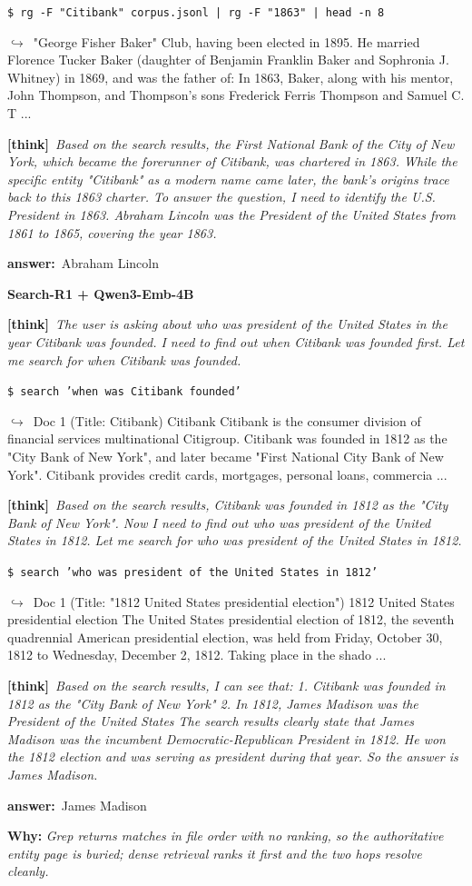 \documentclass{llmxive}
\providecommand{\cmark}{\ding{51}}
\providecommand{\thk}[1]{{\footnotesize\textbf{[think]}\ \textit{#1}\par}}
\providecommand{\cmd}[1]{{\footnotesize\texttt{\$\ #1}\par}}
\providecommand{\retr}[1]{{\footnotesize\quad$\hookrightarrow$\ #1\par}}
\providecommand{\ans}[1]{{\footnotesize\textbf{answer:}\ #1\par}}
\begin{document}
\begin{cmpbox}[label={ex:bamboogle-citibank},title={\ \ \textsc{Bamboogle -- grep has no relevance ranking}}]
  \cmd{rg -F "Citibank" corpus.jsonl | rg -F "1863" | head -n 8}
  \retr{"George Fisher Baker" Club, having been elected in 1895. He married Florence Tucker Baker (daughter of Benjamin Franklin Baker and Sophronia J. Whitney) in 1869, and was the father of: In 1863, Baker, along with his mentor, John Thompson, and Thompson's sons Frederick Ferris Thompson and Samuel C. T ...}
  \thk{Based on the search results, the First National Bank of the City of New York, which became the forerunner of Citibank, was chartered in 1863. While the specific entity "Citibank" as a modern name came later, the bank's origins trace back to this 1863 charter. To answer the question, I need to identify the U.S. President in 1863. Abraham Lincoln was the President of the United States from 1861 to 1865, covering the year 1863.}
  \ans{Abraham Lincoln}
\smallskip\par\textbf{Search-R1 + Qwen3-Emb-4B}~\cmark\par
  \thk{The user is asking about who was president of the United States in the year Citibank was founded. I need to find out when Citibank was founded first. Let me search for when Citibank was founded.}
  \cmd{search 'when was Citibank founded'}
  \retr{Doc 1 (Title: Citibank) Citibank Citibank is the consumer division of financial services multinational Citigroup. Citibank was founded in 1812 as the "City Bank of New York", and later became "First National City Bank of New York". Citibank provides credit cards, mortgages, personal loans, commercia ...}
  \thk{Based on the search results, Citibank was founded in 1812 as the "City Bank of New York". Now I need to find out who was president of the United States in 1812. Let me search for who was president of the United States in 1812.}
  \cmd{search 'who was president of the United States in 1812'}
  \retr{Doc 1 (Title: "1812 United States presidential election") 1812 United States presidential election The United States presidential election of 1812, the seventh quadrennial American presidential election, was held from Friday, October 30, 1812 to Wednesday, December 2, 1812. Taking place in the shado ...}
  \thk{Based on the search results, I can see that: 1. Citibank was founded in 1812 as the "City Bank of New York" 2. In 1812, James Madison was the President of the United States The search results clearly state that James Madison was the incumbent Democratic-Republican President in 1812. He won the 1812 election and was serving as president during that year. So the answer is James Madison.}
  \ans{James Madison}
\smallskip\par\textbf{Why:} \textit{Grep returns matches in file order with no ranking, so the authoritative entity page is buried; dense retrieval ranks it first and the two hops resolve cleanly.}
\end{cmpbox}\bigskip
\end{document}
